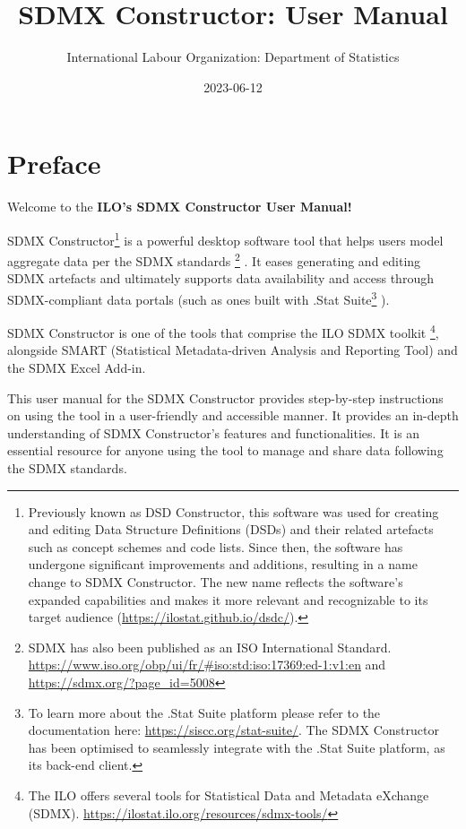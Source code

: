 \documentclass[
]{book}
\title{SDMX Constructor: User Manual}
\author{International Labour Organization: Department of Statistics}
\date{2023-06-12}
\begin{document}
\maketitle

{
\setcounter{tocdepth}{1}
\tableofcontents
}
\hypertarget{preface}{%
\chapter*{Preface}\label{preface}}

Welcome to the \textbf{ILO's SDMX Constructor User Manual!}

SDMX Constructor\footnote{Previously known as DSD Constructor, this software was used for creating and editing Data Structure Definitions (DSDs) and their related artefacts such as concept schemes and code lists. Since then, the software has undergone significant improvements and additions, resulting in a name change to SDMX Constructor. The new name reflects the software's expanded capabilities and makes it more relevant and recognizable to its target audience (\url{https://ilostat.github.io/dsdc/}).} is a powerful desktop software tool that helps users model aggregate data per the SDMX standards \footnote{SDMX has also been published as an ISO International Standard. \url{https://www.iso.org/obp/ui/fr/\#iso:std:iso:17369:ed-1:v1:en} and \url{https://sdmx.org/?page_id=5008}} . It eases generating and editing SDMX artefacts and ultimately supports data availability and access through SDMX-compliant data portals (such as ones built with .Stat Suite\footnote{To learn more about the .Stat Suite platform please refer to the documentation here: \url{https://siscc.org/stat-suite/}. The SDMX Constructor has been optimised to seamlessly integrate with the .Stat Suite platform, as its back-end client.} ).

SDMX Constructor is one of the tools that comprise the ILO SDMX toolkit \footnote{The ILO offers several tools for Statistical Data and Metadata eXchange (SDMX). \url{https://ilostat.ilo.org/resources/sdmx-tools/}}, alongside SMART (Statistical Metadata-driven Analysis and Reporting Tool) and the SDMX Excel Add-in.

This user manual for the SDMX Constructor provides step-by-step instructions on using the tool in a user-friendly and accessible manner. It provides an in-depth understanding of SDMX Constructor's features and functionalities. It is an essential resource for anyone using the tool to manage and share data following the SDMX standards.
\end{document}
